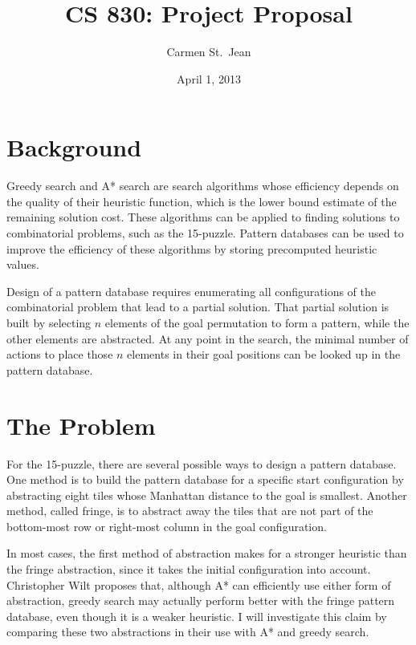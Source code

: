 \documentclass[letterpaper,11pt]{article}
\begin{document}
\title{CS 830: Project Proposal}
\date{April 1, 2013}
\author{Carmen St.\ Jean}

\nocopyright{\gdef\copyright@on{}}

\maketitle

\section{Background}

Greedy search and A* search are search algorithms whose efficiency depends on the quality of their heuristic function, which is the lower bound estimate of the remaining solution cost.  These algorithms can be applied to finding solutions to combinatorial problems, such as the 15-puzzle.  Pattern databases can be used to improve the efficiency of these algorithms by storing precomputed heuristic values.

Design of a pattern database requires enumerating all configurations of the combinatorial problem that lead to a partial solution.  That partial solution is built by selecting $n$ elements of the goal permutation to form a pattern, while the other elements are abstracted.  At any point in the search, the minimal number of actions to place those $n$ elements in their goal positions can be looked up in the pattern database.

\section{The Problem}

For the 15-puzzle, there are several possible ways to design a pattern database.  One method is to build the pattern database for a specific start configuration by abstracting eight tiles whose Manhattan distance to the goal is smallest.  Another method, called fringe, is to abstract away the tiles that are not part of the bottom-most row or right-most column in the goal configuration.

In most cases, the first method of abstraction makes for a stronger heuristic than the fringe abstraction, since it takes the initial configuration into account.  Christopher Wilt proposes that, although A* can efficiently use either form of abstraction, greedy search may actually perform better with the fringe pattern database, even though it is a weaker heuristic.  I will investigate this claim by comparing these two abstractions in their use with A* and greedy search. 
\end{document}
